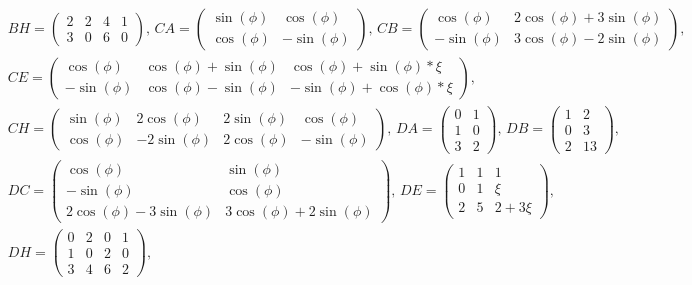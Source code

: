 \documentclass[11pt]{exam}
\begin{document}
\begin{questions}
\begin{solution}
\begin{align*}
	\end{align*}\begin{align*}
		&BH=\left(\begin{array}{cccc}2&2&4&1\\3&0&6&0\end{array}\right),\,
		CA=\left(\begin{array}{cc}\sin(\phi)&\cos(\phi)\\\cos(\phi)&-\sin(\phi)\end{array}\right),\,
		CB=\left(\begin{array}{cc}\cos(\phi)&2\cos(\phi)+3\sin(\phi)\\-\sin(\phi)&3\cos(\phi)-2\sin(\phi)\end{array}\right),\\
		&CE=\left(\begin{array}{ccc}\cos(\phi)&\cos(\phi)+\sin(\phi)&\cos(\phi)+\sin(\phi)*\xi\\-\sin(\phi)&\cos(\phi)-\sin(\phi)&-\sin(\phi)+\cos(\phi)*\xi\end{array}\right),\\
		&CH=\left(\begin{array}{cccc}\sin(\phi)&2\cos(\phi)&2\sin(\phi)&\cos(\phi)\\\cos(\phi)&-2\sin(\phi)&2\cos(\phi)&-\sin(\phi)\end{array}\right),\,
		DA=\left(\begin{array}{cc}0&1\\1&0\\3&2\end{array}\right),\,
		DB=\left(\begin{array}{cc}1&2\\0&3\\2&13\end{array}\right),\\
		&DC=\left(\begin{array}{cc}\cos(\phi)&\sin(\phi)\\-\sin(\phi)&\cos(\phi)\\2\cos(\phi)-3\sin(\phi)&3\cos(\phi)+2\sin(\phi)\end{array}\right),\,
		DE=\left(\begin{array}{ccc}1&1&1\\0&1&\xi\\2&5&2+3\xi\end{array}\right),\\
		&DH=\left(\begin{array}{cccc}0&2&0&1\\1&0&2&0\\3&4&6&2\end{array}\right),\,

\end{align*}
\end{solution}
\end{questions}
\end{document}
